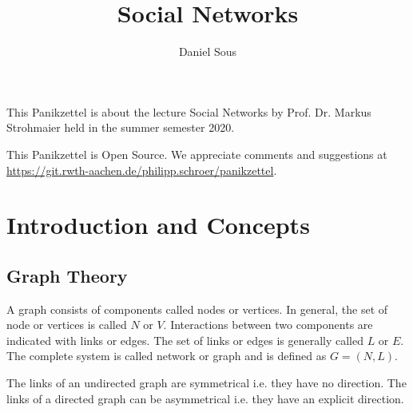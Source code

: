 \documentclass[english]{panikzettel}
\title{Social Networks}
\author{Daniel Sous}
\begin{document}
\maketitle

\tableofcontents

\vspace{1cm}

This Panikzettel is about the lecture Social Networks by Prof. Dr. Markus Strohmaier held in the summer semester 2020.

This Panikzettel is Open Source. 
We appreciate comments and suggestions at \\
\url{https://git.rwth-aachen.de/philipp.schroer/panikzettel}.


\newpage
\section{Introduction and Concepts}

\subsection{Graph Theory}\label{sec:graph_basics}
A graph consists of components called nodes or vertices. 
In general, the set of node or vertices is called $ N $ or $ V $.
Interactions between two components are indicated with links or edges. 
The set of links or edges is generally called $ L $ or $ E $. 
The complete system is called network or graph and is defined as $ G = (N,L) $.

The links of an undirected graph are symmetrical i.e. they have no direction. 
The links of a directed graph can be asymmetrical i.e. they have an explicit direction.
\end{document}
